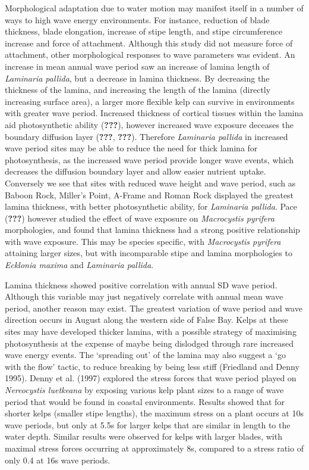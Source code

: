 \documentclass[10pt,a4,]{article}
\begin{document}
Morphological adaptation due to water motion may manifest itself in a
number of ways to high wave energy environments. For instance, reduction
of blade thickness, blade elongation, increase of stipe length, and
stipe circumference increase and force of attachment. Although this
study did not measure force of attachment, other morphological responses
to wave parameters was evident. An increase in mean annual wave period
saw an increase of lamina length of \emph{Laminaria pallida}, but a
decrease in lamina thickness. By decreasing the thickness of the lamina,
and increasing the length of the lamina (directly increasing surface
area), a larger more flexible kelp can survive in environments with
greater wave period. Increased thickness of cortical tissues within the
lamina aid photosynthetic ability ({\textbf{???}}), however increased
wave exposure deceases the boundary diffusion layer ({\textbf{???}},
{\textbf{???}}). Therefore \emph{Laminaria pallida} in increased wave
period sites may be able to reduce the need for thick lamina for
photosynthesis, as the increased wave period provide longer wave events,
which decreases the diffusion boundary layer and allow easier nutrient
uptake. Conversely we see that sites with reduced wave height and wave
period, such as Baboon Rock, Miller's Point, A-Frame and Roman Rock
displayed the greatest lamina thickness, with better photosynthetic
ability, for \emph{Laminaria pallida}. Pace ({\textbf{???}}) however
studied the effect of wave exposure on \emph{Macrocystis pyrifera}
morphologies, and found that lamina thickness had a strong positive
relationship with wave exposure. This may be species specific, with
\emph{Macrocystis pyrifera} attaining larger sizes, but with
incomparable stipe and lamina morphologies to \emph{Ecklonia maxima} and
\emph{Laminaria pallida}.

Lamina thickness showed positive correlation with annual SD wave period.
Although this variable may just negatively correlate with annual mean
wave period, another reason may exist. The greatest variation of wave
period and wave direction occurs in August along the western side of
False Bay. Kelps at these sites may have developed thicker lamina, with
a possible strategy of maximising photosynthesis at the expense of maybe
being dislodged through rare increased wave energy events. The
`spreading out' of the lamina may also suggest a `go with the flow'
tactic, to reduce breaking by being less stiff (Friedland and Denny
1995). Denny et al. (1997) explored the stress forces that wave period
played on \emph{Nereocystis luetkeana} by exposing various kelp plant
sizes to a range of wave period that would be found in coastal
environments. Results showed that for shorter kelps (smaller stipe
lengths), the maximum stress on a plant occurs at 10s wave periods, but
only at 5.5s for larger kelps that are similar in length to the water
depth. Similar results were observed for kelps with larger blades, with
maximal stress forces occurring at approximately 8s, compared to a
stress ratio of only 0.4 at 16s wave periods.
\end{document}

